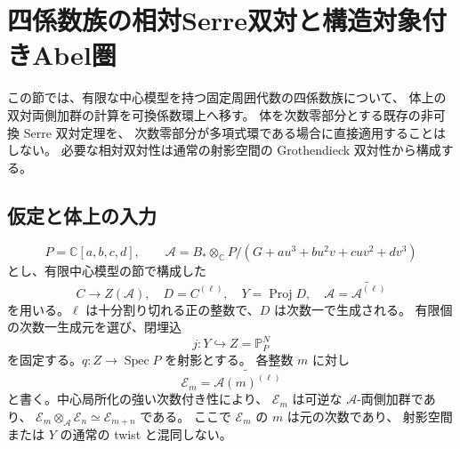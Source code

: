 \section{四係数族の相対Serre双対と構造対象付きAbel圏}
\label{sec:relative-serre-projective}

この節では、有限な中心模型を持つ固定周囲代数の四係数族について、
体上の双対両側加群の計算を可換係数環上へ移す。
体を次数零部分とする既存の非可換 Serre 双対定理を、
次数零部分が多項式環である場合に直接適用することはしない。
必要な相対双対性は通常の射影空間の Grothendieck 双対性から構成する。

\subsection{仮定と体上の入力}

\[
 P=\mathbb C[a,b,c,d],\qquad
 \mathcal A=B_*\otimes_{\mathbb C}P/
 (G+au^3+bu^2v+cuv^2+dv^3)
\]
とし、有限中心模型の節で構成した
\[
 C\longrightarrow Z(\mathcal A),\quad
 D=C^{(\ell)},\quad
 Y=\operatorname{Proj}D,\quad
 \mathscr A=\widetilde{\mathcal A^{(\ell)}}
\]
を用いる。$\ell$ は十分割り切れる正の整数で、$D$ は次数一で生成される。
有限個の次数一生成元を選び、閉埋込
\[
 j:Y\hookrightarrow Z=\mathbb P^N_P
\]
を固定する。$q:Z\to\operatorname{Spec}P$ を射影とする。
各整数 $m$ に対し
\[
 \mathscr E_m=\widetilde{\mathcal A(m)^{(\ell)}}
\]
と書く。中心局所化の強い次数付き性により、
$\mathscr E_m$ は可逆な $\mathscr A$-両側加群であり、
$\mathscr E_m\otimes_{\mathscr A}\mathscr E_n\simeq\mathscr E_{m+n}$ である。
ここで $\mathscr E_m$ の $m$ は元の次数であり、
射影空間または $Y$ の通常の twist と混同しない。

